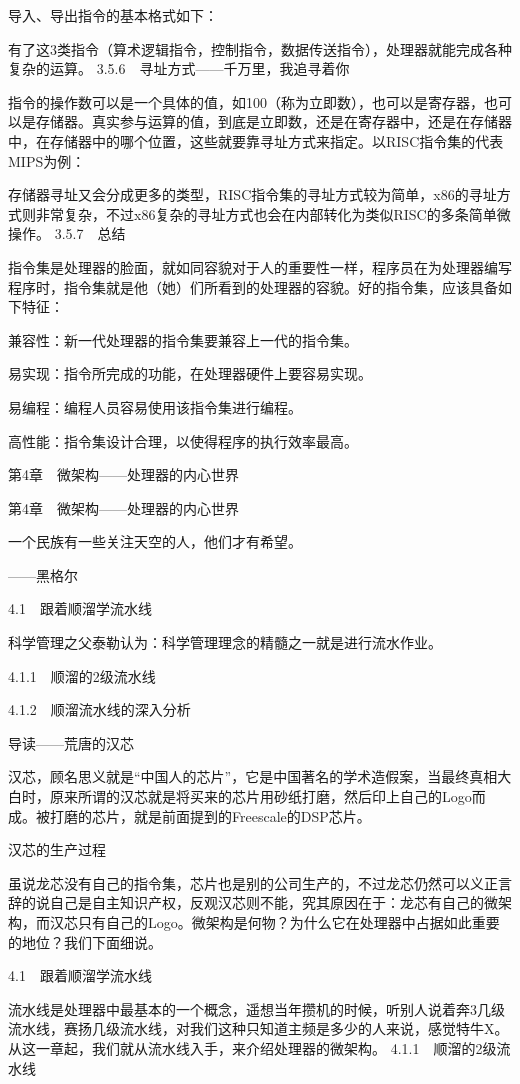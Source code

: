\documentclass[12pt,UTF8]{ctexbook}
\begin{document}
导入、导出指令的基本格式如下：

有了这3类指令（算术逻辑指令，控制指令，数据传送指令），处理器就能完成各种复杂的运算。
3.5.6　寻址方式——千万里，我追寻着你

指令的操作数可以是一个具体的值，如100（称为立即数），也可以是寄存器，也可以是存储器。真实参与运算的值，到底是立即数，还是在寄存器中，还是在存储器中，在存储器中的哪个位置，这些就要靠寻址方式来指定。以RISC指令集的代表MIPS为例：

存储器寻址又会分成更多的类型，RISC指令集的寻址方式较为简单，x86的寻址方式则非常复杂，不过x86复杂的寻址方式也会在内部转化为类似RISC的多条简单微操作。
3.5.7　总结

指令集是处理器的脸面，就如同容貌对于人的重要性一样，程序员在为处理器编写程序时，指令集就是他（她）们所看到的处理器的容貌。好的指令集，应该具备如下特征：

兼容性：新一代处理器的指令集要兼容上一代的指令集。

易实现：指令所完成的功能，在处理器硬件上要容易实现。

易编程：编程人员容易使用该指令集进行编程。

高性能：指令集设计合理，以使得程序的执行效率最高。


第4章　微架构——处理器的内心世界

第4章　微架构——处理器的内心世界

一个民族有一些关注天空的人，他们才有希望。

——黑格尔

4.1　跟着顺溜学流水线

科学管理之父泰勒认为：科学管理理念的精髓之一就是进行流水作业。

4.1.1　顺溜的2级流水线

4.1.2　顺溜流水线的深入分析



导读——荒唐的汉芯

汉芯，顾名思义就是“中国人的芯片”，它是中国著名的学术造假案，当最终真相大白时，原来所谓的汉芯就是将买来的芯片用砂纸打磨，然后印上自己的Logo而成。被打磨的芯片，就是前面提到的Freescale的DSP芯片。

汉芯的生产过程

虽说龙芯没有自己的指令集，芯片也是别的公司生产的，不过龙芯仍然可以义正言辞的说自己是自主知识产权，反观汉芯则不能，究其原因在于：龙芯有自己的微架构，而汉芯只有自己的Logo。微架构是何物？为什么它在处理器中占据如此重要的地位？我们下面细说。


4.1　跟着顺溜学流水线

流水线是处理器中最基本的一个概念，遥想当年攒机的时候，听别人说着奔3几级流水线，赛扬几级流水线，对我们这种只知道主频是多少的人来说，感觉特牛X。从这一章起，我们就从流水线入手，来介绍处理器的微架构。
4.1.1　顺溜的2级流水线
\end{document}

